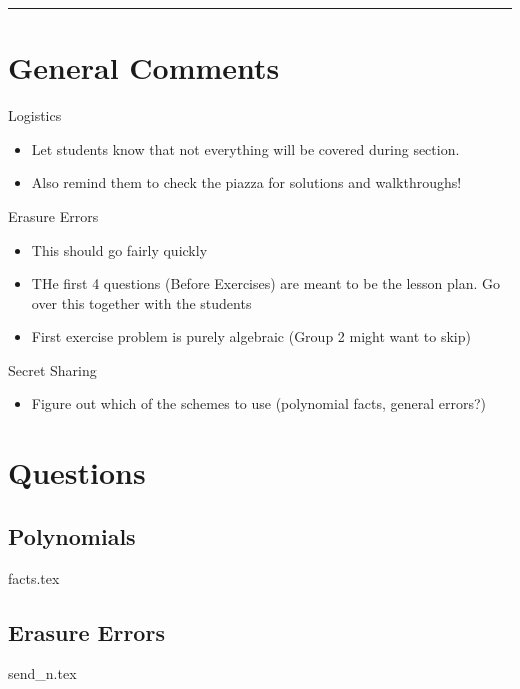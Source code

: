 \documentclass{exam}
\title{}
\date{Polynomials, Secret Sharing, Erasure Errors, General Errors, Self Reference}
\begin{document}
\maketitle
\rule{\textwidth}{0.15em}
\fontsize{12}{15}\selectfont
\thispagestyle{empty}


\section{General Comments}
\begin{questions}
\item Logistics
\begin{itemize}
\item Let students know that not everything will be covered during section. 
\item Also remind them to check the piazza for solutions and walkthroughs!
\end{itemize}
\item Erasure Errors
\begin{itemize}
\item This should go fairly quickly
\item THe first 4 questions (Before Exercises) are meant to be the lesson plan. Go over this together with the students
\item First exercise problem is purely algebraic (Group 2 might want to skip)
\end{itemize}



\item Secret Sharing
\begin{itemize}
\item Figure out which of the schemes to use (polynomial facts, general errors?)
\end{itemize}

\end{questions}

\section{Questions}
\subsection{Polynomials}
\begin{enumerate}
{facts.tex}
\end{enumerate}

\subsection{Erasure Errors}
\begin{enumerate}
{send_n.tex}
\end{enumerate}
\end{document}
